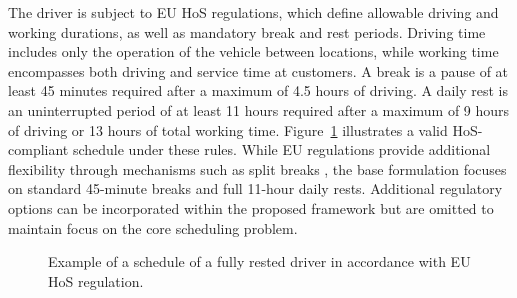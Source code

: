 \documentclass[3p,11pt,authoryear]{elsarticle}  %
\begin{document}
The driver is subject to EU HoS regulations, which define allowable driving and working durations, as well as mandatory break and rest periods. Driving time includes only the operation of the vehicle between locations, while working time encompasses both driving and service time at customers. A break is a pause of at least 45 minutes required after a maximum of 4.5 hours of driving. A daily rest is an uninterrupted period of at least 11 hours required after a maximum of 9 hours of driving or 13 hours of total working time. Figure~\ref{fig:driver_schedule} illustrates a valid HoS-compliant schedule under these rules. While EU regulations provide additional flexibility through mechanisms such as split breaks %
, the base formulation focuses on standard 45-minute breaks and full 11-hour daily rests. Additional regulatory options can be incorporated within the proposed framework but are omitted to maintain focus on the core scheduling problem. 


\begin{figure}[htbp!]
\centering
{}
\caption{Example of a schedule of a fully rested driver in accordance with EU HoS regulation.}
\label{fig:driver_schedule}
\end{figure}
\end{document}
